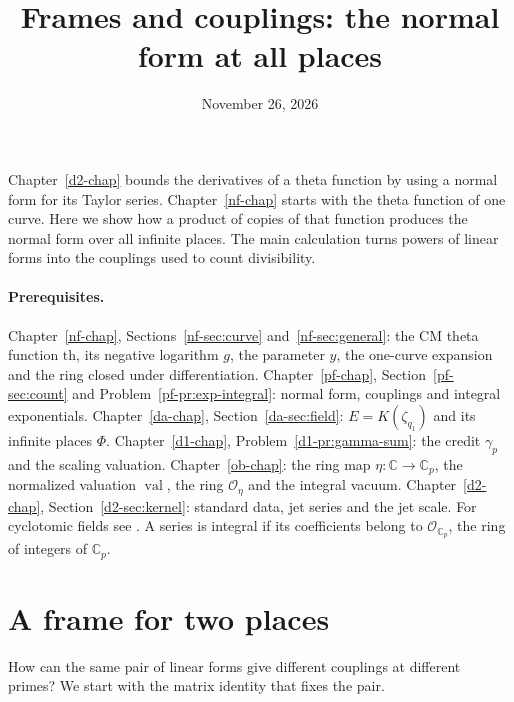 \documentclass[reqno]{amsart}
\title{Frames and couplings: the normal form at all places}
\author{}
\date{November 26, 2026}
\newcounter{chap}
\theoremstyle{plain}
\theoremstyle{definition}
\theoremstyle{remark}
\newcommand{\C}{\mathbb C}
\newcommand{\Oc}{\mathcal O}
\newcommand{\Op}{\mathcal O_{\C_p}}
\newcommand{\val}{\operatorname{val}}
\newcommand{\tth}{\mathrm{th}}
\begin{document}
\maketitle
{}\label{chap}

Chapter~\ref{d2-chap} bounds the derivatives of a theta function by using a normal form for its Taylor series.  Chapter~\ref{nf-chap} starts with the theta function of one curve.  Here we show how a product of copies of that function produces the normal form over all infinite places.  The main calculation turns powers of linear forms into the couplings used to count divisibility.

\paragraph{Prerequisites.}
Chapter~\ref{nf-chap}, Sections~\ref{nf-sec:curve} and~\ref{nf-sec:general}: the CM theta function \(\tth\), its negative logarithm \(g\), the parameter \(y\), the one-curve expansion and the ring closed under differentiation.  Chapter~\ref{pf-chap}, Section~\ref{pf-sec:count} and Problem~\ref{pf-pr:exp-integral}: normal form, couplings and integral exponentials.  Chapter~\ref{da-chap}, Section~\ref{da-sec:field}: \(E=K(\zeta_{q_1})\) and its infinite places \(\Phi\).  Chapter~\ref{d1-chap}, Problem~\ref{d1-pr:gamma-sum}: the credit \(\gamma_p\) and the scaling valuation.  Chapter~\ref{ob-chap}: the ring map \(\eta\colon\C\to\C_p\), the normalized valuation \(\val\), the ring \(\Oc_\eta\) and the integral vacuum.  Chapter~\ref{d2-chap}, Section~\ref{d2-sec:kernel}: standard data, jet series and the jet scale.  For cyclotomic fields see \cite{Wa}.  A series is integral if its coefficients belong to \(\Op\), the ring of integers of \(\C_p\).

\section{A frame for two places}\label{sec:model}

How can the same pair of linear forms give different couplings at different primes? We start with the matrix identity that fixes the pair.
\end{document}
